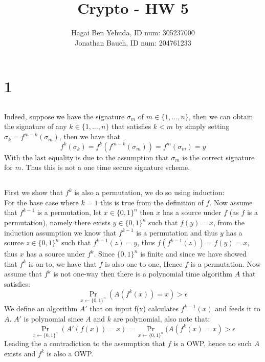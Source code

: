 \documentclass{article}
\title{Crypto - HW 5}
\author{Hagai Ben Yehuda, ID num: 305237000\\ Jonathan Bauch, ID num: 204761233}
\date{}
\begin{document}
  \maketitle

\section{1}
\subsection{}%
Indeed, suppose we have the signature $\sigma_m$ of $m\in\{1,..., n\}$, then we can obtain the signature of any $k \in\{1,...,n\}$ that satisfies $k < m$ by simply setting $\sigma_k = f^{m-k}(\sigma_m)$, then we have that 
\[f^{k}(\sigma_k) = f^{k}(f^{m-k}(\sigma_m)) = f^{m}(\sigma_m) = y\]
With the last equality is due to the assumption that $\sigma_m$ is the correct signature for $m$.
Thus this is not a one time secure signature scheme.

\subsection{}%
First we show that $f^k$ is also a permutation, we do so using induction:\\
For the base case where $k = 1$ this is true from the definition of $f$.
Now assume that $f^{k-1}$ is a permutation, let $x\in\{0,1\}^n$ then $x$ has a source under $f$ (as $f$ is a permutation), namely there exists $y\in\{0,1\}^n$ such that $f(y) = x$, from the induction assumption we know that $f^{k-1}$ is a permutation and thus $y$ has a source $z\in\{0,1\}^n$ such that $f^{k-1}(z) = y$, thus $f(f^{k-1}(z)) = f(y) = x$, thus $x$ has a source under $f^k$.
Since $\{0,1\}^n$ is finite and since we have showed that $f^k$ is on-to, we have that $f$ is also one to one, Hence $f$ is a permutation.
Now assume that $f^k$ is not  one-way then there is a polynomial time algorithm $A$ that satisfies: 
\[\Pr_{x\leftarrow \{0,1\}^n}(A(f^k(x)) = x) > \epsilon\]
We define an algorithm $A'$ that on input f(x) calculates $f^{k-1}(x)$ and feeds it to $A$. $A'$ is polynomial since $A$ and $k$ are polynomial, also note that:
\[\Pr_{x\leftarrow \{0,1\}^n}(A'(f(x)) = x) = \Pr_{x\leftarrow \{0,1\}^n}(A(f^k(x) = x) > \epsilon\]
Leading the a contradiction to the assumption that $f$ is a OWP, hence no such $A$ exists and $f^k$ is also a OWP.
\end{document}
